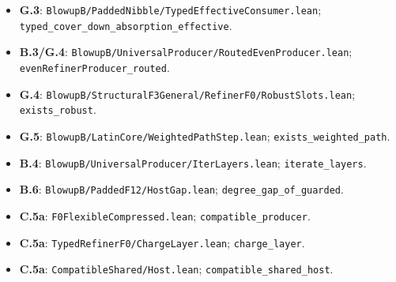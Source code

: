 \documentclass[english,11pt,a4paper]{article}
\begin{document}
\begin{itemize}
\item
  \textbf{G.3}: \texttt{Blowup\allowbreak{}B/\allowbreak{}Padd\allowbreak{}ed\allowbreak{}Nibble/\allowbreak{}Typ\allowbreak{}ed\allowbreak{}Effective\allowbreak{}C\allowbreak{}onsumer.\allowbreak{}lean\allowbreak{}}; \texttt{typed\_\allowbreak{}cover\_\allowbreak{}\allowbreak{}down\_\allowbreak{}absorpt\allowbreak{}ion\_\allowbreak{}effectiv\allowbreak{}e}.
\item
  \textbf{B.3/G.4}: \texttt{Blowup\allowbreak{}B/\allowbreak{}Univ\allowbreak{}ersal\allowbreak{}Produce\allowbreak{}r/\allowbreak{}Routed\allowbreak{}Even\allowbreak{}\allowbreak{}Producer.\allowbreak{}lea\allowbreak{}n}; \texttt{even\allowbreak{}Refiner\allowbreak{}P\allowbreak{}roducer\_\allowbreak{}rout\allowbreak{}ed}.
\item
  \textbf{G.4}: \texttt{Blowup\allowbreak{}B/\allowbreak{}Stru\allowbreak{}ctural\allowbreak{}F3Gene\allowbreak{}ral/\allowbreak{}Refiner\allowbreak{}F\allowbreak{}0/\allowbreak{}Robust\allowbreak{}Slot\allowbreak{}s.\allowbreak{}lean}; \texttt{exists\_\allowbreak{}robus\allowbreak{}t}.
\item
  \textbf{G.5}: \texttt{Blowup\allowbreak{}B/\allowbreak{}Lati\allowbreak{}n\allowbreak{}Core/\allowbreak{}Weight\allowbreak{}ed\allowbreak{}Path\allowbreak{}Step.\allowbreak{}l\allowbreak{}ean}; \texttt{exists\_\allowbreak{}weigh\allowbreak{}ted\_\allowbreak{}path}.
\item
  \textbf{B.4}: \texttt{Blowup\allowbreak{}B/\allowbreak{}Univ\allowbreak{}ersal\allowbreak{}Produce\allowbreak{}r/\allowbreak{}Iter\allowbreak{}Layers\allowbreak{}.\allowbreak{}lean}; \texttt{iterate\_\allowbreak{}laye\allowbreak{}rs}.
\item
  \textbf{B.6}: \texttt{Blowup\allowbreak{}B/\allowbreak{}Padd\allowbreak{}ed\allowbreak{}F12/\allowbreak{}Host\allowbreak{}Ga\allowbreak{}p.\allowbreak{}lean}; \texttt{degree\_\allowbreak{}gap\_\allowbreak{}o\allowbreak{}f\_\allowbreak{}guarded}.
\item
  \textbf{C.5a}: \texttt{F0Flexible\allowbreak{}Co\allowbreak{}mpressed.\allowbreak{}lea\allowbreak{}n}; \texttt{compatible\_\allowbreak{}p\allowbreak{}roducer}.
\item
  \textbf{C.5a}: \texttt{Typed\allowbreak{}Refiner\allowbreak{}\allowbreak{}F0/\allowbreak{}Charge\allowbreak{}Lay\allowbreak{}er.\allowbreak{}lean}; \texttt{charge\_\allowbreak{}layer\allowbreak{}}.
\item
  \textbf{C.5a}: \texttt{Compatible\allowbreak{}Sh\allowbreak{}ared/\allowbreak{}Host.\allowbreak{}le\allowbreak{}an}; \texttt{compatible\_\allowbreak{}s\allowbreak{}hared\_\allowbreak{}host}.

\end{itemize}
\end{document}
